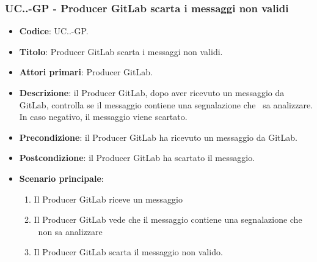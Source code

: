 		\subsubsection{UC\theuccount.\thesubuccount.\thesubsubuccount-GP - Producer GitLab scarta i messaggi non validi}
			
			\begin{itemize}
				\item \textbf{Codice}: UC\theuccount.\thesubuccount.\thesubsubuccount-GP.
				\item \textbf{Titolo}: Producer GitLab scarta i messaggi non validi.
				\item \textbf{Attori primari}: Producer GitLab.
				\item \textbf{Descrizione}: il Producer GitLab, dopo aver ricevuto un messaggio da GitLab, controlla
                se il messaggio contiene una segnalazione che \progetto\ sa analizzare. In caso negativo, il messaggio viene scartato.
                \item \textbf{Precondizione}: il Producer GitLab ha ricevuto un messaggio da GitLab.
                \item \textbf{Postcondizione}: il Producer GitLab ha scartato il messaggio.
                \item \textbf{Scenario principale}: 
                \begin{enumerate}
                    \item Il Producer GitLab riceve un messaggio
                    \item Il Producer GitLab vede che il messaggio contiene una segnalazione che \progetto\ non sa analizzare
                    \item Il Producer GitLab scarta il messaggio non valido.
                \end{enumerate}
            \end{itemize}
